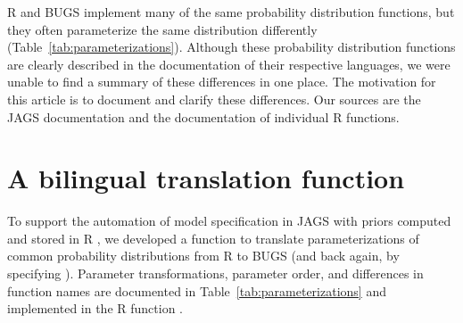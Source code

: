R and BUGS implement many of the same probability distribution functions,
but they often parameterize the same distribution differently
(Table~\ref{tab:parameterizations}).
Although these probability distribution functions 
are clearly described in the documentation of their respective languages, 
we were unable to find a summary of these differences in one place.
The motivation for this article is to document and clarify these differences. 
Our sources are the JAGS documentation \citep{plummer2011} 
and the documentation of individual R functions.

\section{A bilingual translation function}

To support the automation of model specification in JAGS with priors computed and stored in R \citep{lebauer2012ffb}, we developed a function to translate parameterizations of common probability distributions from R to BUGS (and back again, by specifying ).
Parameter transformations, parameter order, and differences in function names are documented in Table~\ref{tab:parameterizations} and implemented in the R function . 


